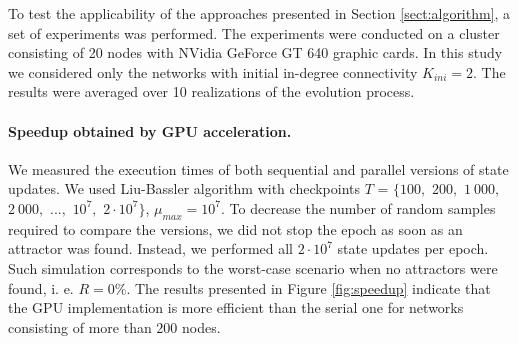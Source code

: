 \documentclass[procedia]{easychair}
\begin{document}
	To test the applicability of the approaches presented in Section \ref{sect:algorithm}, a set of experiments was performed. The experiments were conducted on a cluster consisting of 20 nodes with NVidia GeForce GT 640 graphic cards. In this study we considered only the networks with initial in-degree connectivity $K_{ini}=2$. The results were averaged over 10 realizations of the evolution process.
	
	\paragraph{Speedup obtained by GPU acceleration.} We measured the execution times of both sequential and parallel versions of state updates. We used Liu-Bassler algorithm with checkpoints $T$ = $\{100,$ $200,$ $1~000,$ $2~000,$ $...,$ $10^7,$ $2 \cdot 10^7\}$, $\mu_{max} = 10^7$. To decrease the number of random samples required to compare the versions, we did not stop the epoch as soon as an attractor was found. Instead, we performed all $2 \cdot 10^7$ state updates per epoch. Such simulation corresponds to the worst-case scenario when no attractors were found, i. e. $R = 0\%$. The results presented in Figure \ref{fig:speedup} indicate that the GPU implementation is more efficient than the serial one for networks consisting of more than $200$ nodes.
	
\end{document}

